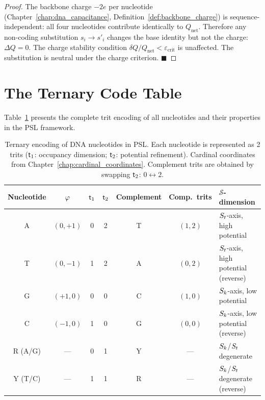 \begin{proof}
The backbone charge $-2e$ per nucleotide (Chapter~\ref{chap:dna_capacitance},
Definition~\ref{def:backbone_charge}) is sequence-independent: all four
nucleotides contribute identically to $Q_{\mathrm{net}}$. Therefore
any non-coding substitution $s_i \to s'_i$ changes the base identity
but not the charge: $\Delta Q = 0$. The charge stability condition
$\delta Q / Q_{\mathrm{net}} < \varepsilon_{\mathrm{crit}}$ is
unaffected. The substitution is neutral under the charge criterion.
$\blacksquare$
\end{proof}

\section{The Ternary Code Table}
\label{sec:ternary_code_table}

Table~\ref{tab:ternary_encoding} presents the complete trit encoding of
all nucleotides and their properties in the PSL framework.

\begin{table}[htbp]
\centering
\caption{Ternary encoding of DNA nucleotides in PSL. Each nucleotide
is represented as 2 trits ($\mathsf{t}_1$: occupancy dimension; $\mathsf{t}_2$:
potential refinement). Cardinal coordinates from Chapter~\ref{chap:cardinal_coordinates}.
Complement trits are obtained by swapping $\mathsf{t}_2$: $0 \leftrightarrow 2$.}
\label{tab:ternary_encoding}
\begin{tabular}{ccccccl}
\toprule
Nucleotide & $\varphi$ & $\mathsf{t}_1$ & $\mathsf{t}_2$ & Complement & Comp.\ trits & $\mathcal{S}$-dimension \\
\midrule
A & $(0,+1)$ & 0 & 2 & T & $(1,2)$ & $S_t$-axis, high potential \\
T & $(0,-1)$ & 1 & 2 & A & $(0,2)$ & $S_t$-axis, high potential (reverse) \\
G & $(+1,0)$ & 0 & 0 & C & $(1,0)$ & $S_k$-axis, low potential \\
C & $(-1,0)$ & 1 & 0 & G & $(0,0)$ & $S_k$-axis, low potential (reverse) \\
\midrule
R (A/G)    & ---        & 0 & 1 & Y & ---  & $S_k$/$S_t$ degenerate \\
Y (T/C)    & ---        & 1 & 1 & R & ---  & $S_k$/$S_t$ degenerate (reverse) \\
\bottomrule
\end{tabular}
\end{table}

